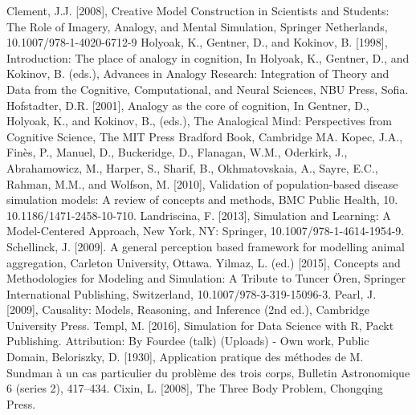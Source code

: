 \begin{thebibliography}{99}
 Clement, J.J. [2008], Creative Model Construction in Scientists and Students: The Role of Imagery, Analogy, and Mental Simulation, Springer Netherlands, 10.1007/978-1-4020-6712-9
 Holyoak, K., Gentner, D., and Kokinov, B. [1998], Introduction: The place of analogy in cognition, In Holyoak, K., Gentner, D., and Kokinov, B. (eds.), Advances in Analogy Research: Integration of Theory and Data from the Cognitive, Computational, and Neural Sciences, NBU Press, Sofia.
 Hofstadter, D.R. [2001], Analogy as the core of cognition, In Gentner, D., Holyoak, K., and Kokinov, B., (eds.), The Analogical Mind: Perspectives from Cognitive Science, The MIT Press Bradford Book, Cambridge MA.
 Kopec, J.A., Fin\`es, P., Manuel, D., Buckeridge, D., Flanagan, W.M., Oderkirk, J., Abrahamowicz, M., Harper, S., Sharif, B., Okhmatovskaia, A., Sayre, E.C., Rahman, M.M., and Wolfson, M. [2010], Validation of population-based disease simulation models: A review of concepts and methods, BMC Public Health, 10. 10.1186/1471-2458-10-710.
 Landriscina, F. [2013], Simulation and Learning: A Model-Centered Approach, New York, NY: Springer, 10.1007/978-1-4614-1954-9. 
 Schellinck, J. [2009]. A general perception based framework for modelling animal aggregation, Carleton University, Ottawa.
 Yilmaz, L. (ed.) [2015], Concepts and Methodologies for Modeling and Simulation: A Tribute to Tuncer \"Oren, Springer International Publishing, Switzerland, 10.1007/978-3-319-15096-3.
 Pearl, J. [2009], Causality: Models, Reasoning, and Inference (2nd ed.), Cambridge University Press.  
 Templ, M. [2016], Simulation for Data Science with R, Packt Publishing. 
 Attribution: By Fourdee (talk) (Uploads) - Own work, Public Domain, 
 
 Beloriszky, D. [1930], Application pratique des m\'ethodes de M. Sundman \`a un cas particulier du probl\`eme des trois corps, Bulletin Astronomique 6 (series 2), 417–434.
 Cixin, L. [2008], The Three Body Problem, Chongqing Press.
 

\end{thebibliography}
